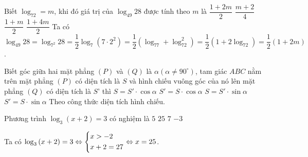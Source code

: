 \begin{ex}%
	Biết $\log_72=m$, khi đó giá trị của $\log_{49}28$ được tính theo $m$ là
	\choice
		{\True $\dfrac{1+2m}{2}$}
		{$\dfrac{m+2}{4}$}
		{$\dfrac{1+m}{2}$}
		{$\dfrac{1+4m}{2}$}
	\loigiai
		{
			Ta có $\log_{49}28=\log_{7^2}28=\dfrac{1}{2}\log_7 \left(7 \cdot 2^2\right)=\dfrac{1}{2}\left(\log_77+\log_72^2\right)=\dfrac{1}{2}\left(1+2\log_72\right)=\dfrac{1}{2}\left(1+2m\right)$.
		}
\end{ex}

\begin{ex}%
	Biết góc giữa hai mặt phẳng $(P)$ và $(Q)$ là $\alpha \left(\alpha \ne 90^\circ\right)$, tam giác $ABC$ nằm trên mặt phẳng $(P)$ có diện tích là $S$ và hình chiếu vuông góc của nó lên mặt phẳng $(Q)$ có diện tích là $S’$ thì
	\choice
		{$S=S' \cdot \cos \alpha $}
		{\True $S'=S \cdot \cos \alpha $}
		{$S=S' \cdot \sin \alpha $}
		{$S'=S \cdot \sin \alpha $}
	\loigiai
		{Theo công thức diện tích hình chiếu.}
\end{ex}

\begin{ex}%
	Phương trình $\log_3\left(x+2\right)=3$ có nghiệm là
	\choice
		{$5$}
		{\True $25$}
		{$7$}
		{$-3$}
	\loigiai
		{
			Ta có 
			$\log_3\left(x+2\right)=3\Leftrightarrow \left\{\begin{aligned}
				& x>-2 \\ 
				& x+2=27\end{aligned}\right.\Leftrightarrow x=25$.
			
		}
\end{ex}

